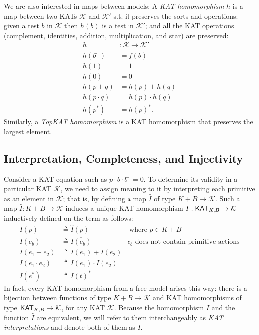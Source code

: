 We are also interested in maps between models:
A \emph{KAT homomorphism} \(h\) is a map between two KATs \(\mathcal{K}\) and \(\mathcal{K}'\)
s.t. it preserves the sorts and operations:
given a test \(b\) in \(\mathcal{K}\) then \(h(b)\) is a test in \(\mathcal{K}'\);
and all the KAT operations (complement, identities, addition, multiplication, and star) are preserved:
\begin{align*}
    h & : 𝒦  →  𝒦'\\
    h(b̄) & = \overline{f(b)} \\  
    h(1) & = 1 \\  
    h(0) & = 0 \\
    h(p + q) & = h(p) + h(q) \\  
    h(p ⋅ q) & = h(p) ⋅ h(q) \\  
    h(p^*) & = h(p)^*.
\end{align*}
Similarly, a \emph{TopKAT homomorphism} is a KAT homomorphism that preserves the
largest element.

\subsection{Interpretation, Completeness, and Injectivity}\label{sec: completeness background}

Consider a KAT equation such as \(p ⋅ b ⋅ b̄ = 0\). To determine its
validity in a particular KAT \(\mathcal{K}\), we need to assign meaning to it by
interpreting each primitive as an element in \(\mathcal{K}\); that is, by defining a map
\(\hat{I}\) of type \(K + B  \to  \mathcal{K}\).  Such a map \(\hat{I}: K + B  \to  \mathcal{K}\) induces a
unique KAT homomorphism \(I : \mathsf{KAT}_{K,B}  \to  \mathcal{K}\) inductively defined on the term 
as follows:
\begin{equation}
    \begin{aligned}
        I(p)       &  \triangleq  \hat{I}(p)    & \text{ where } p  \in  K + B \\
        I(\overline{e_b}) &  \triangleq  \overline{I(e_b)} 
            & \text{\(e_b\) does not contain primitive actions} \\
        I(e_1 + e_2) &  \triangleq  I(e_1) + I(e_2)                     \\
        I(e_1  \cdot  e_2) &  \triangleq  I(e_1)  \cdot  I(e_2)                     \\
        I(e^*)     &  \triangleq  I(t)^*
    \end{aligned}
\end{equation}
In fact, every KAT homomorphism from a free model arises this way: there is a
bijection between functions of type \(K + B  \to  \mathcal{K}\) and KAT homomorphisms of type
\(\mathsf{KAT}_{K, B}  \to  \mathcal{K}\), for any KAT \(\mathcal{K}\).  
Because the homomorphism \(I\) and the function \(\hat{I}\) are equivalent, 
we will refer to them interchangeably as \emph{KAT interpretations} 
and denote both of them as \(I\).

